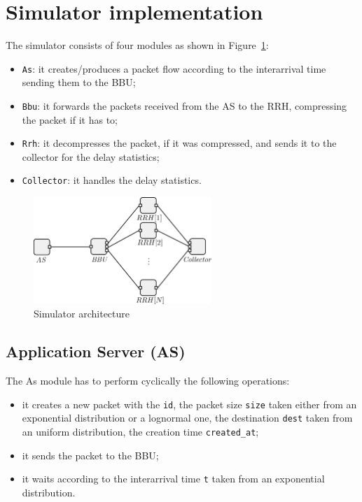 \documentclass[11pt,a4paper,oneside, openright]{article}
\begin{document}
\section{Simulator implementation}
The simulator consists of four modules as shown in Figure~\ref{fig:simulator}:
\begin{itemize}
  \item \texttt{As}: it creates/produces a packet flow according to the interarrival time sending them to the BBU;
  \item \texttt{Bbu}: it forwards the packets received from the AS to the RRH, compressing the packet if it has to;
  \item \texttt{Rrh}: it decompresses the packet, if it was compressed, and sends it to the collector for the delay statistics;
  \item \texttt{Collector}: it handles the delay statistics.
\end{itemize}

\begin{figure}[h]
    \centering
    \includegraphics[width=0.6\textwidth]{images/simulator}
    \caption{Simulator architecture}
    \label{fig:simulator}
\end{figure}

\subsection{Application Server (AS)}
The As module has to perform cyclically the following operations:
\begin{itemize}
    \item[1.] it creates a new packet with the \texttt{id}, the packet size \texttt{size} taken either from an exponential distribution or a lognormal one, the destination \texttt{dest} taken from an uniform distribution, the creation time \texttt{created\_at};
    \item[2.] it sends the packet to the BBU;
    \item[3.] it waits according to the interarrival time \texttt{t} taken from an exponential distribution.
\end{itemize}
\end{document}
